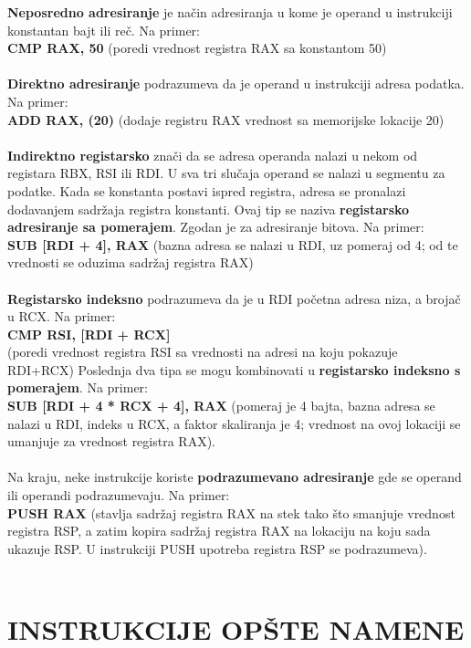 \documentclass[a4paper]{article}
\begin{document}
\textbf{Neposredno adresiranje} je na\v cin adresiranja u kome je operand u instrukciji konstantan bajt ili re\v c. Na primer:\\
\textbf {CMP RAX, 50} (poredi vrednost registra RAX sa konstantom 50) \\ \\
\textbf{Direktno adresiranje} podrazumeva da je operand u instrukciji adresa podatka. Na primer:\\
\textbf{ADD RAX, (20)} (dodaje registru RAX vrednost sa memorijske lokacije 20) \\ \\
\textbf{Indirektno registarsko} zna\v ci da se adresa operanda nalazi u nekom od registara RBX, RSI ili RDI. U sva tri 
slu\v caja operand se nalazi u segmentu za podatke. Kada se konstanta postavi ispred registra, adresa se pronalazi dodavanjem
sadr\v zaja registra konstanti. Ovaj tip se naziva \textbf {registarsko adresiranje sa pomerajem}. Zgodan je za adresiranje 
bitova. Na primer:\\
\textbf{SUB [RDI + 4], RAX}  (bazna adresa se nalazi u RDI, uz pomeraj od 4; od te vrednosti se oduzima sadr\v zaj 
registra RAX)\\ \\
\textbf {Registarsko indeksno} podrazumeva da je u RDI po\v cetna adresa niza, a broja\v c u RCX. Na primer:\\
\textbf{CMP RSI, [RDI + RCX]} \\ (poredi vrednost registra RSI sa vrednosti na adresi na koju pokazuje RDI+RCX)
Poslednja dva tipa se mogu kombinovati u \textbf {registarsko indeksno s pomerajem}. Na primer: \\
\textbf {SUB [RDI + 4 * RCX + 4], RAX} (pomeraj je 4 bajta, bazna adresa se nalazi u RDI, indeks u RCX, a faktor skaliranja
je 4; vrednost na ovoj lokaciji se umanjuje za vrednost registra RAX). \\ \\
Na kraju, neke instrukcije koriste \textbf {podrazumevano adresiranje} gde se operand ili operandi podrazumevaju. Na primer: \\
\textbf{PUSH RAX} (stavlja sadr\v zaj registra RAX na stek tako \v sto smanjuje vrednost registra RSP, a zatim kopira sadr\v zaj
registra RAX na lokaciju na koju sada ukazuje RSP. U instrukciji PUSH upotreba registra RSP se podrazumeva). \\ \\


\section{\textbf{INSTRUKCIJE OP\v STE NAMENE}}
\end{document}
